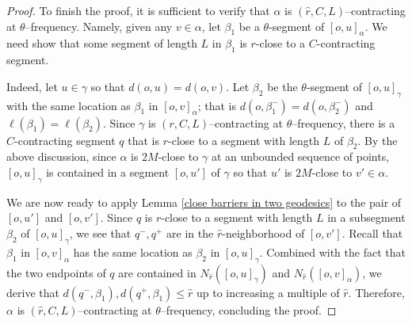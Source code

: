\documentclass[10pt,a4paper]{amsart}
\begin{document}
\begin{proof}
To finish the proof, it is sufficient to verify that $\alpha$ is $(\hat r, C, L)$--contracting   at $\theta$–frequency. 
Namely, given any $v\in \alpha$, let $\beta_1$ be a   $\theta$-segment of $[o,u]_\alpha$. We need show that some segment of length $L$  in $\beta_1$ is $r$-close to a $C$-contracting segment. 

Indeed, let $u\in \gamma$  so that $d(o,u)=d(o,v)$.    Let $\beta_2$ be the $\theta$-segment of $[o,u]_\gamma$ with the same location as $\beta_1$ in $[o,v]_\alpha$; that is $d(o,\beta_1^-)=d(o,\beta_2^-)$ and $\ell(\beta_1)=\ell(\beta_2)$.  Since $\gamma$ is $( r, C, L)$--contracting   at $\theta$–frequency, there is a $C$-contracting segment $q$ that is $r$-close to  a segment with length $L$ of $\beta_2$. By the above discussion, since $\alpha$ is $2M$-close to  $\gamma$ at an unbounded sequence of points,  $[o,u]_\gamma$ is contained in a segment $[o,u']$ of $\gamma$ so that $u'$ is $2M$-close to $v'\in \alpha$.    

We are now ready to apply  Lemma \ref{close barriers in two geodesics} to the pair of $[o,u']$ and $[o,v']$. Since $q$ is $r$-close to a segment with length $L$ in a subsegment $\beta_2$ of  $[o,u]_\gamma$, we see that  $q^-,q^+$ are in the $\hat r$-neighborhood of $[o,v']$. Recall that $\beta_1$ in $[o,v]_\alpha$ has the same location as $\beta_2$ in $[o,u]_\gamma$. Combined with the fact that the two endpoints of $q$ are contained in $N_{\hat r}([o,u]_\gamma)$ and $N_{\hat r}([o,v]_\alpha)$, we derive that $d(q^-,\beta_1),d(q^+,\beta_1)\le \hat r$ up to increasing a multiple of $\hat r$. Therefore,  $\alpha$ is $(\hat r, C, L)$--contracting   at $\theta$–frequency, concluding the proof.
\end{proof}
\end{document}
